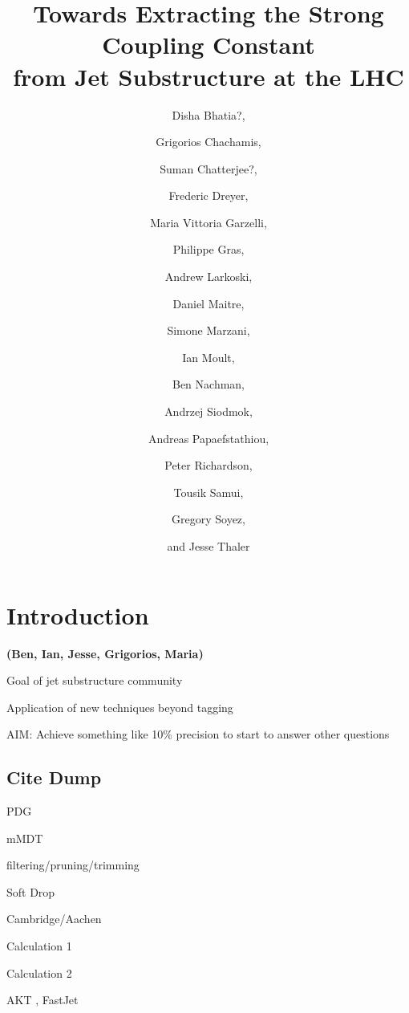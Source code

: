 \documentclass[11pt,letterpaper]{article}
\newcommand{\info}[1]{\textbf{\textcolor{mildred}{(#1)}}}
\begin{document}
\title{Towards Extracting the Strong Coupling Constant \\ from Jet Substructure at the LHC}

\author[a]{Disha Bhatia?,}
\author[a]{Grigorios Chachamis,}
\author[a]{Suman Chatterjee?,}
\author[a]{Frederic Dreyer,}
\author[a]{Maria Vittoria Garzelli,}
\author[a]{Philippe Gras,}
\author[a]{Andrew Larkoski,}
\author[a]{Daniel Maitre,}
\author[a]{Simone Marzani, }
\author[a]{Ian Moult,}
\author[a]{Ben Nachman,}
\author[a]{Andrzej Siodmok,}
\author[a]{Andreas Papaefstathiou,}
\author[a]{Peter Richardson,}
\author[a]{Tousik Samui,}
\author[a]{Gregory Soyez,}
\author[a]{and Jesse Thaler}



\maketitle

\section{Introduction}

\info{Ben, Ian, Jesse, Grigorios, Maria}

Goal of jet substructure community

Application of new techniques beyond tagging

AIM:  Achieve something like 10\% precision to start to answer other questions

\subsection{Cite Dump}

PDG \cite{Olive:2016xmw}

mMDT \cite{Dasgupta:2013ihk,Dasgupta:2013via}

filtering/pruning/trimming \cite{Butterworth:2008iy,Ellis:2009su,Ellis:2009me,Krohn:2009th}

Soft Drop \cite{Larkoski:2014wba}

Cambridge/Aachen \cite{Wobisch:1998wt,Dokshitzer:1997in}

Calculation 1 \cite{Frye:2016okc,Frye:2016aiz}

Calculation 2 \cite{Marzani:2017mva}

AKT \cite{Cacciari:2008gp}, FastJet \cite{Cacciari:2011ma}
\end{document}
